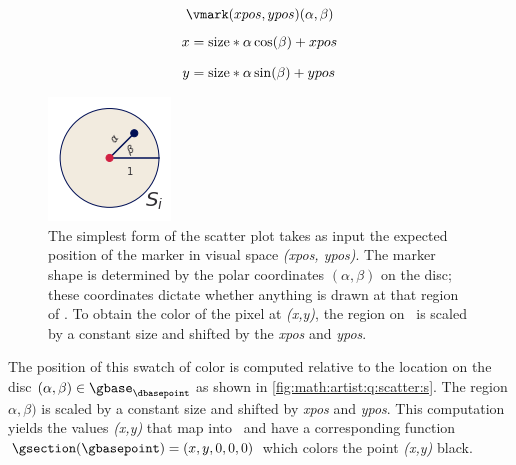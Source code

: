 \documentclass[../main.tex]{subfiles}
\begin{document}
\begin{figure} [H]

\begin{minipage}{.5\textwidth}
    \begingroup \leqnomode
    \begin{equation}
        \vmark(xpos, ypos)(\alpha, \beta)
        \label{eq:eq:math:artist:q:scatter}
    \end{equation}
    \endgroup
    \begin{align*}
        x &= \text{size} *\alpha \cos(\beta) + xpos \\[.5\baselineskip]
        y &= \text{size} *\alpha \sin(\beta) + ypos
    \end{align*}
\end{minipage}
\begin{minipage}{.5\textwidth}
    \centering
    \includegraphics{figures/math/scatter_s.png}
\end{minipage}
\caption{The simplest form of the scatter plot takes as input the expected position of the marker in visual space \textit{(xpos, ypos)}. The marker shape is determined by the polar coordinates $(\alpha, \beta)$ on the disc; these coordinates dictate whether anything is drawn at that region of \gbase. To obtain the color of the pixel at \textit{(x,y)}, the region on \gbase\ is scaled by a constant size and shifted by the \textit{xpos} and \textit{ypos}.}
\label{fig:math:artist:q:scatter:s}
\end{figure}
The position of this swatch of color is computed relative to the location on the disc \((\alpha, \beta) \in \gbase_{\dbasepoint}\) as shown in \autoref{fig:math:artist:q:scatter:s}. The region $\alpha, \beta)$ is scaled by a constant size and shifted by \textit{xpos} and \textit{ypos}. This computation yields the values \textit{(x,y)} that map into \gfiber\ and have a corresponding function $\gsection(\gbasepoint) = (x, y, 0, 0, 0)$ which colors the point \textit{(x,y)} black. 
\end{document}
